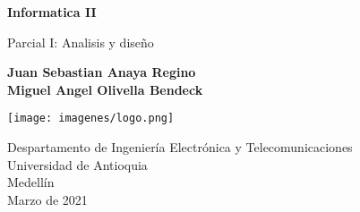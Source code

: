 \documentclass{article}
\begin{document}
\begin{titlepage}
    \begin{center}
        \vspace*{1cm}
            
        \Huge
        \textbf{Informatica II}
            
        \vspace{0.3cm}
        \LARGE
        Parcial I: Analisis y diseño
            
        \vspace{1.5cm}
            
        \textbf{Juan Sebastian Anaya Regino\\Miguel Angel Olivella Bendeck}
        
        \vspace{0.8cm}
        \centering
        \texttt{[image: imagenes/logo.png]}
            
        \vfill
            
        \vspace{0.7cm}
            
        \Large
        Despartamento de Ingeniería Electrónica y Telecomunicaciones\\
        Universidad de Antioquia\\
        Medellín\\
        Marzo de 2021
            
    \end{center}
\end{titlepage}
\end{document}
